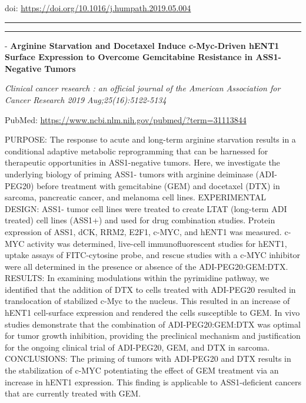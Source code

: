 \documentclass[]{article}
\begin{document}
doi: \url{https://doi.org/10.1016/j.humpath.2019.05.004}

{}

{}

\begin{center}\rule{0.5\linewidth}{\linethickness}\end{center}

\begin{center}\rule{0.5\linewidth}{\linethickness}\end{center}

 - \textbf{Arginine Starvation and Docetaxel Induce c-Myc-Driven hENT1
Surface Expression to Overcome Gemcitabine Resistance in ASS1-Negative
Tumors}

\emph{Clinical cancer research : an official journal of the American
Association for Cancer Research 2019 Aug;25(16):5122-5134}

PubMed: \url{https://www.ncbi.nlm.nih.gov/pubmed/?term=31113844}

PURPOSE: The response to acute and long-term arginine starvation results
in a conditional adaptive metabolic reprogramming that can be harnessed
for therapeutic opportunities in ASS1-negative tumors. Here, we
investigate the underlying biology of priming ASS1- tumors with arginine
deiminase (ADI-PEG20) before treatment with gemcitabine (GEM) and
docetaxel (DTX) in sarcoma, pancreatic cancer, and melanoma cell lines.
EXPERIMENTAL DESIGN: ASS1- tumor cell lines were treated to create LTAT
(long-term ADI treated) cell lines (ASS1+) and used for drug combination
studies. Protein expression of ASS1, dCK, RRM2, E2F1, c-MYC, and hENT1
was measured. c-MYC activity was determined, live-cell immunofluorescent
studies for hENT1, uptake assays of FITC-cytosine probe, and rescue
studies with a c-MYC inhibitor were all determined in the presence or
absence of the ADI-PEG20:GEM:DTX. RESULTS: In examining modulations
within the pyrimidine pathway, we identified that the addition of DTX to
cells treated with ADI-PEG20 resulted in translocation of stabilized
c-Myc to the nucleus. This resulted in an increase of hENT1 cell-surface
expression and rendered the cells susceptible to GEM. In vivo studies
demonstrate that the combination of ADI-PEG20:GEM:DTX was optimal for
tumor growth inhibition, providing the preclinical mechanism and
justification for the ongoing clinical trial of ADI-PEG20, GEM, and DTX
in sarcoma. CONCLUSIONS: The priming of tumors with ADI-PEG20 and DTX
results in the stabilization of c-MYC potentiating the effect of GEM
treatment via an increase in hENT1 expression. This finding is
applicable to ASS1-deficient cancers that are currently treated with
GEM.
\end{document}
